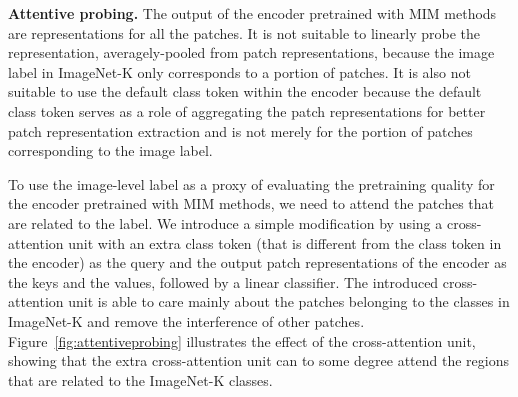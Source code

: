 \documentclass[twocolumn]{svjour3}          \smartqed  \usepackage{graphicx}
\begin{document}
\vspace{1mm}
\noindent\textbf{Attentive probing.}
The output of the encoder
pretrained with MIM methods
are representations
for all the patches.
It is not suitable
to linearly probe the representation,
averagely-pooled from patch representations,
because the image label in ImageNet-K
only corresponds to a portion of patches.
It is also not suitable
to use the default class token within the encoder
because the default class token serves as
a role of aggregating the patch representations
for better patch representation extraction
and is not merely for the portion of patches
corresponding to the image label.


To use the image-level label
as a proxy of
evaluating the pretraining quality
for the encoder pretrained with MIM methods,
we need to attend the patches 
that are related to the label. 
We introduce a simple modification
by using a cross-attention unit 
with an extra class token (that is different from the class token in the encoder)
as the query
and  
the output patch representations of the encoder as the keys and the values,
followed by a linear classifier.
The introduced cross-attention unit
is able to care mainly about the patches belonging
to the  classes in ImageNet-K
and remove the interference
of other patches.
Figure~\ref{fig:attentiveprobing} illustrates the effect
of the cross-attention unit,
showing that the extra cross-attention unit
can to some degree
attend the regions
that are related to the  ImageNet-K classes.
\end{document}
